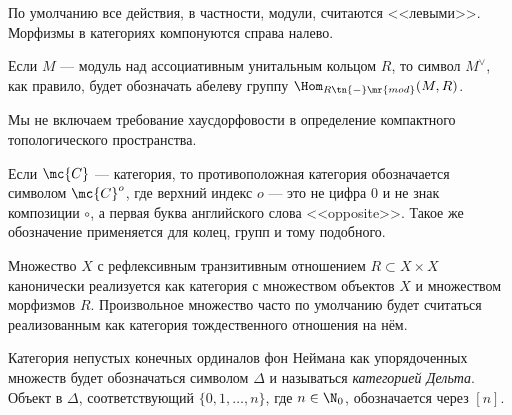 \documentclass[
	extrafontsizes,
	11pt,
	hyphens,
]{memoir}
\begin{document}
\begin{convention}
По умолчанию все действия, в частности, модули, считаются <<левыми>>.
Морфизмы в категориях компонуются справа налево.
\end{convention}

\begin{notation}
Если \(M\) --- модуль над ассоциативным унитальным кольцом \(R\), то символ
\(M^\vee\),
как правило, будет обозначать абелеву группу
\(\Hom_{R\tn{-}\mr{mod}}(M,R)\).
\end{notation}

\begin{convention}[\scshape Компактность и хаусдорфовость]
Мы не включаем требование хаусдорфовости в определение компактного топологического пространства.
\end{convention}

\begin{notation}
Если \(\mc{C}\) --- категория, то противоположная категория обозначается символом \(\mc{C}^o\),
где верхний индекс \(o\) --- это не цифра \(0\) и не знак композиции \(\circ\), а первая буква английского слова <<\textenglish{opposite}>>.
Такое же обозначение применяется для колец, групп и тому подобного.
\end{notation}

\begin{convention}
Множество \(X\) с рефлексивным транзитивным отношением \(R \subset X \times X\) канонически реализуется как категория с множеством объектов \(X\) и множеством морфизмов \(R\).
Произвольное множество часто по умолчанию будет считаться реализованным как категория тождественного отношения на нём.
\end{convention}

\begin{notation}
Категория непустых конечных ординалов фон Неймана как упорядоченных множеств будет обозначаться символом \(\Delta\) и называться \emph{категорией Дельта}.
Объект в \(\Delta\), соответствующий \(\{0, 1, \dots{}, n\}\), где \(n \in \N_0\), обозначается через \([n]\).
\end{notation}
\end{document}
